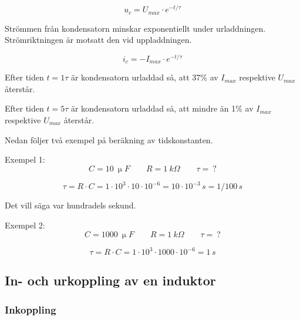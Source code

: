 \[ u_c = U_{max} \cdot e^{-t/\tau} \]

Strömmen från kondensatorn minskar exponentiellt under urladdningen.
Strömriktningen är motsatt den vid uppladdningen.

\[ i_c = - I_{max} \cdot e^{-t/\tau} \]

Efter tiden \(t = 1\tau\) är kondensatorn urladdad så, att 37\% av \(I_{max}\)
respektive \(U_{max}\) återstår.

Efter tiden \(t = 5\tau\) är kondensatorn urladdad så, att mindre än 1\% av
\(I_{max}\) respektive \(U_{max}\) återstår.

Nedan följer två exempel på beräkning av tidskonstanten.

\noindent Exempel 1:
\[ C = \SI{10}{\upmu F} \qquad R = \SI{1}{k\Omega} \qquad \tau =\ ? \]

\[ \tau = R \cdot C = 1 \cdot 10^3 \cdot 10 \cdot 10^{-6} =
	10 \cdot 10^{-3}\,\unit{s} = 1/100\,\unit{s} \]
	
Det vill säga var hundradels sekund.

\noindent Exempel 2:
\[ C = \SI{1000}{\upmu F} \qquad R = \SI{1}{k\Omega} \qquad \tau =\ ? \]

\[  \tau = R \cdot C = 1 \cdot 10^3 \cdot 1000 \cdot 10^{-6} 
    = 1\,\unit{s} \]



\subsection{In- och urkoppling av en induktor}

\subsubsection{Inkoppling}

